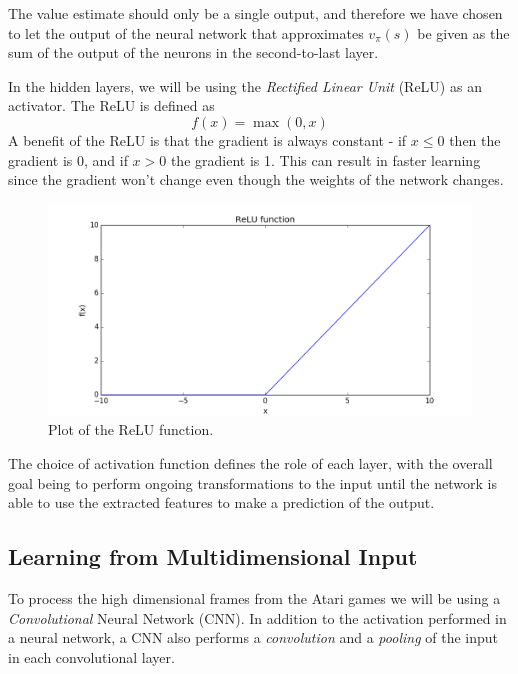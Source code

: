 \documentclass[11pt]{article}
\begin{document}
The value estimate should only be a single output, and therefore we have chosen to
let the output of the neural network that approximates $v_\pi(s)$ be given
as the sum of the output of the neurons in the second-to-last layer.

In the hidden layers, we will be using the \textit{Rectified
Linear Unit} (ReLU) as an activator.
The ReLU is defined as
\begin{equation}
    f(x) = \max(0,x)
\end{equation}
A benefit of the ReLU is that the gradient is always constant - 
if $x \leq 0$ then the gradient is 0, and if $x > 0$ the gradient is 1.
This can result in faster learning since the gradient won't change even
though the weights of the network changes.
\begin{figure}[!h]
    \centering
    \includegraphics[width=15cm]{include/relu.png}
    \caption{Plot of the ReLU function.}
    \label{fig:relu}
\end{figure}

The choice of activation function defines the role of each layer,
with the overall goal being to perform ongoing transformations
to the input until the network is able to use the extracted
features to make a prediction of the output.

\subsection{Learning from Multidimensional Input}

To process the high dimensional frames from the Atari games we will be using
a \textit{Convolutional} Neural Network (CNN).
In addition to the activation performed in a neural network, a CNN
also performs a \textit{convolution} and a \textit{pooling} of the input in each convolutional layer.
\end{document}
